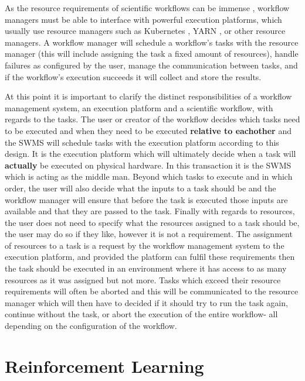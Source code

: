 As the resource requirements of scientific workflows can be immense \cite{ResourceProvisioning}, workflow managers must be able to interface with powerful execution platforms, which usually use resource managers such as Kubernetes \cite{kubernetes}, YARN \cite{yarn}, or other resource managers. A workflow manager will schedule a workflow’s tasks with the resource manager (this will include assigning the task a fixed amount of resources), handle failures as configured by the user, manage the communication between tasks, and if the workflow’s execution succeeds it will collect and store the results.

At this point it is important to clarify the distinct responsibilities of a workflow management system, an execution platform and a scientific workflow, with regards to the tasks. The user or creator of the workflow decides which tasks need to be executed and when they need to be executed \textbf{relative to eachother} and the SWMS will schedule tasks with the execution platform according to this design. It is the execution platform which will ultimately decide when a task will \textbf{actually} be executed on physical hardware. In this transaction it is the SWMS which is acting as the middle man. 
Beyond which tasks to execute and in which order, the user will also decide what the inputs to a task should be and the workflow manager will ensure that before the task is executed those inputs are available and that they are passed to the task. Finally with regards to resources, the user does not need to specify what the resources assigned to a task should be, the user may do so if they like, however it is not a requirement. The assignment of resources to a task is a request by the workflow management system to the execution platform, and provided the platform can fulfil these requirements then the task should be executed in an environment where it has access to as many resources as it was assigned but not more. Tasks which exceed their resource requirements will often be aborted and this will be communicated to the resource manager which will then have to decided if it should try to run the task again, continue without the task, or abort the execution of the entire workflow- all depending on the configuration of the workflow.

\section{Reinforcement Learning}
\label{sec:rl}

